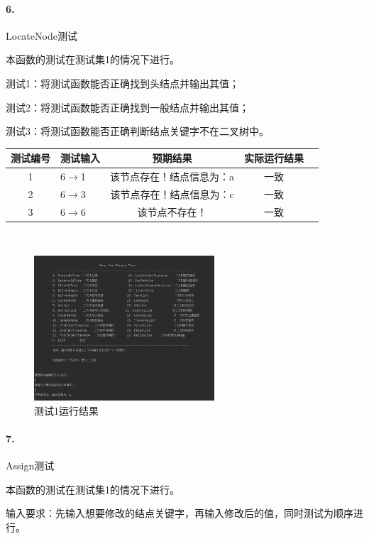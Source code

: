 \documentclass[supercite]{Experimental_Report}
\theoremstyle{definition}
\begin{document}
\paragraph{ 6.}LocateNode测试

本函数的测试在测试集1的情况下进行。

测试1：将测试函数能否正确找到头结点并输出其值；

测试2：将测试函数能否正确找到一般结点并输出其值；

测试3：将测试函数能否正确判断结点关键字不在二叉树中。

\vspace{0.5em}

\begin{tabular}{|c|l|c|c|c|}
	\hline
	测试编号 & 测试输入 & 预期结果 & 实际运行结果 \\
	\hline
	1 & 6$\rightarrow$1 & 该节点存在！结点信息为：a & 一致 \\
	\hline
	2 & 6$\rightarrow$3 & 该节点存在！结点信息为：c & 一致 \\
	\hline
	3 & 6$\rightarrow$6 & 该节点不存在！ & 一致 \\
	\hline
\end{tabular}

~\

\begin{figure}[H]
 	\centering
 	\includegraphics[width=0.6\textwidth]{images/二叉树测试6.png}
 	\caption{测试1运行结果}
 	\label{txlab}
 \end{figure}

\paragraph{ 7.}Assign测试

本函数的测试在测试集1的情况下进行。

输入要求：先输入想要修改的结点关键字，再输入修改后的值，同时测试为顺序进行。
\end{document}
